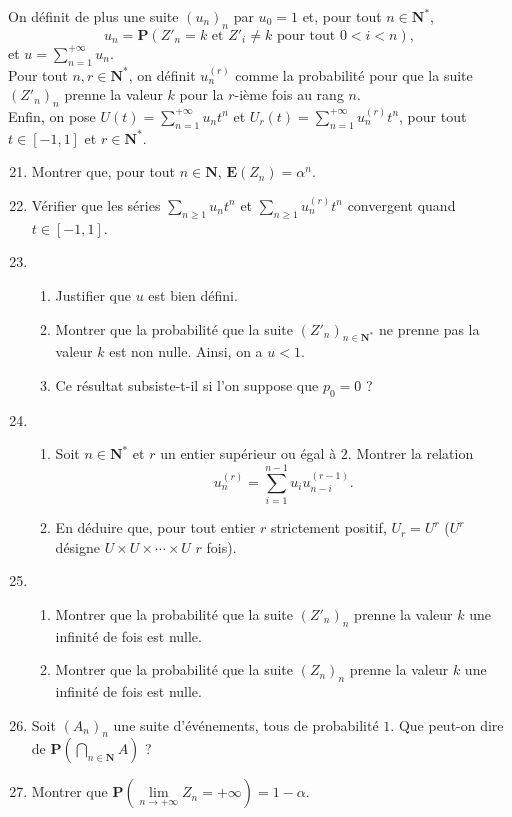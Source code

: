 \documentclass[a4paper,11pt]{article}
\newcommand{\N}{\mathbf{N}}
\renewcommand{\P}{\mathbf{P}}
\newcommand{\E}{\mathbf{E}}
\newcommand{\suite}[2]{{\left({#1}_{#2}\right)}_{#2}}
\begin{document}
On définit de plus une suite $\suite{u}{n}$ par $u_0=1$ et, pour tout $n\in\N^*$,
\[u_{n}=\P\left({Z'}_n=k\text{ et }{Z'_i}\neq k\text{ pour tout }0<i<n\right),\]
et $u=\displaystyle\sum_{n=1}^{+\infty}u_n$.\\

Pour tout $n,r\in\N^*$, on définit $u_n^{(r)}$ comme la probabilité pour que la suite $\suite{Z'}{n}$ prenne la valeur $k$ pour la $r$-ième fois au rang $n$. \\

Enfin, on pose $U(t)=\displaystyle\sum_{n=1}^{+\infty}u_nt^n$ et $U_r(t)=\displaystyle\sum_{n=1}^{+\infty}u_n^{(r)}t^n$, pour tout $t\in[-1,1]$ et $r\in\N^*$.

\begin{enumerate}
\setcounter{enumi}{20}
\item Montrer que, pour tout $n\in\N$, $\E(Z_n)=\alpha^n$.
\item Vérifier que les séries $\displaystyle\sum_{n\geq 1}u_nt^n$ et $\displaystyle\sum_{n\geq 1}u_n^{(r)}t^n$ convergent quand $t\in[-1,1]$.
\item 
\begin{enumerate}
\item Justifier que $u$ est bien défini.
\item Montrer que la probabilité que la suite ${\left({Z'}_n\right)}_{n\in\N^*}$ ne prenne pas la valeur $k$ est non nulle. Ainsi, on a $u<1$.
\item Ce résultat subsiste-t-il si l'on suppose que $p_0=0$ ?
\end{enumerate}
\item \begin{enumerate}
\item Soit $n\in\N^*$ et $r$ un entier supérieur ou égal à $2$. Montrer la relation
\[u_n^{(r)}=\displaystyle\sum_{i=1}^{n-1}u_iu_{n-i}^{(r-1)}.\]
\item En déduire que, pour tout entier $r$ strictement positif, $U_r=U^r$ ($U^r$ désigne $U\times U\times\cdots\times U$ $r$ fois).
\end{enumerate}
\item
\begin{enumerate}
\item Montrer que la probabilité que la suite $\suite{Z'}{n}$ prenne la valeur $k$ une infinité de fois est nulle.
\item Montrer que la probabilité que la suite $\suite{Z}{n}$ prenne la valeur $k$ une infinité de fois est nulle.
\end{enumerate}
\item Soit $\suite{A}{n}$ une suite d'événements, tous de probabilité $1$. Que peut-on dire de $\P\left(\displaystyle\bigcap _{n\in\N}A\right)$ ?
\item Montrer que $\P\left(\lim\limits_{n\to+\infty}Z_n=+\infty\right)=1-\alpha$.
\end{enumerate}
\end{document}
